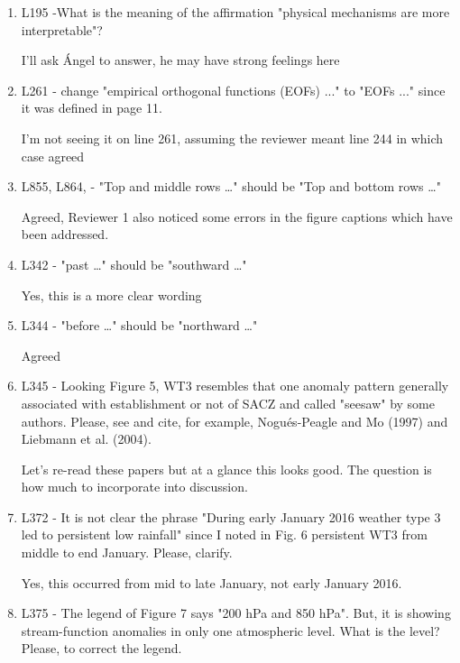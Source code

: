 \documentclass{article}
\newenvironment{answer}{\begin{mdframed}}{\end{mdframed}}
\begin{document}
\begin{enumerate}
	\item L195 -What is the meaning of the affirmation "physical mechanisms are more interpretable"?
	\begin{answer}
		I'll ask \'{A}ngel to answer, he may have strong feelings here
	\end{answer}
	\item L261 - change "empirical orthogonal functions (EOFs) ..."  to "EOFs ..." since it was defined in page 11.
	\begin{answer}
		I'm not seeing it on line 261, assuming the reviewer meant line 244 in which case agreed
	\end{answer}
	\item L855, L864, - "Top and middle rows …" should be "Top and bottom rows …"
	\begin{answer}
		Agreed, Reviewer 1 also noticed some errors in the figure captions which have been addressed.
	\end{answer}
	\item L342 - "past …" should be "southward …"
	\begin{answer}
		Yes, this is a more clear wording
	\end{answer}
	\item L344 - "before …" should be "northward …"
	\begin{answer}
		Agreed
	\end{answer}
	\item L345 - Looking Figure 5, WT3 resembles that one anomaly pattern generally associated with establishment or not of SACZ and called "seesaw" by some authors.  Please, see and cite, for example, Nogués-Peagle and Mo  (1997) and Liebmann et al. (2004).
	\begin{answer}
		Let's re-read these papers but at a glance this looks good.
		The question is how much to incorporate into discussion.
	\end{answer}
	\item L372 - It is not clear the phrase "During early January 2016 weather type 3 led to persistent low rainfall" since I noted in Fig. 6 persistent WT3 from middle to end January. Please, clarify.
	\begin{answer}
		Yes, this occurred from mid to late January, not early January 2016.
	\end{answer}
	\item L375 - The legend of Figure 7 says "200 hPa and 850 hPa". But, it is showing stream-function anomalies in only one atmospheric level. What is the level? Please, to correct the legend.

\end{enumerate}
\end{document}
